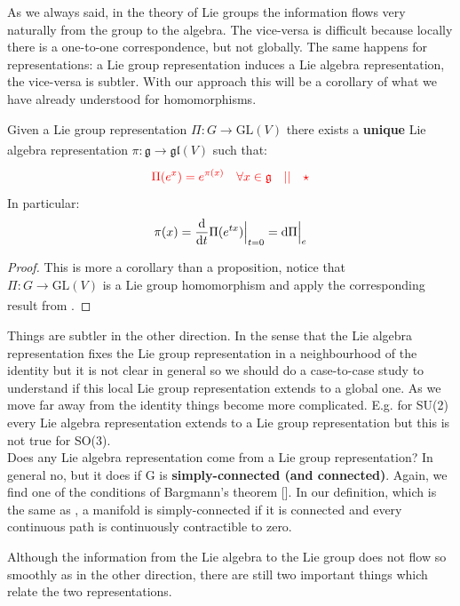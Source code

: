 \documentclass[../main.tex]{subfiles}
\begin{document}
As we always said, in the theory of Lie groups the information flows very naturally from the group to the algebra. The vice-versa is difficult because locally there is a one-to-one correspondence, but not globally. The same happens for representations: a Lie group representation induces a Lie algebra representation, the vice-versa is subtler. With our approach this will be a corollary of what we have already understood for homomorphisms.
\begin{proposition}
Given a Lie group representation $\Pi:G\xrightarrow[]{}\text{GL}(V)$ there exists a \textbf{unique} Lie algebra representation $\pi:\mathfrak{g}\xrightarrow[]{}\mathfrak{gl}(V)$ such that:
\[
{\color{red}\Pi(e^x)=e^{\pi(x)} \quad \forall x\in\mathfrak{g} \quad || \quad \star}
\]
In particular:
\[
\pi(x)=\dv{}{t}\Pi(e^{tx})\Bigr|_{\substack{t=0}}=\dd\Pi\Bigr|_{\substack{e}}
\]
\end{proposition}
\begin{proof}
This is more a corollary than a proposition, notice that\\ $\Pi:G\xrightarrow[]{}\text{GL}(V)$ is a Lie group homomorphism and apply the corresponding result from .
\end{proof}
\begin{kaobox}[frametitle=Remark]
 Things are subtler in the other direction. In the sense that the Lie algebra representation fixes the Lie group representation in a neighbourhood of the identity but it is not clear in general so we should do a case-to-case study to understand if this local Lie group representation extends to a global one. As we move far away from the identity things become more complicated. E.g. for SU(2) every Lie algebra representation extends to a Lie group representation but this is not true for SO(3).\\
 Does any Lie algebra representation come from a Lie group representation? In general no, but it does if G is \textbf{simply-connected (and connected)}. Again, we find one of the conditions of Bargmann's theorem []. In our definition, which is the same as \cite{Hall2015}, a manifold is simply-connected if it is connected and every continuous path is continuously contractible to zero.
\end{kaobox}
Although the information from the Lie algebra to the Lie group does not flow so smoothly as in the other direction, there are still two important things which relate the two representations.
\end{document}
